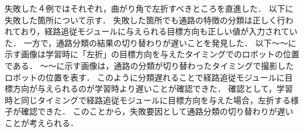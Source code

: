 失敗した４例ではそれぞれ，曲がり角で左折すべきところを直進した．
以下に失敗した箇所について示す．
失敗した箇所でも通路の特徴の分類は正しく行われており，経路追従モジュールに与えられる目標方向も正しい値が入力されていた．
一方で，通路分類の結果の切り替わりが遅いことを発見した．
以下〜〜に示す画像は学習時に「左折」の目標方向を与えたタイミングでのロボットの位置である．
〜〜に示す画像は，通路の分類が切り替わったタイミングで撮影したロボットの位置を表す．
このように分類遅れることで経路追従モジュールに目標方向が与えられるのが学習時より遅いことが確認できた．
確認として，学習時と同じタイミングで経路追従モジュールに目標方向を与えた場合，左折する様子が確認できた．
このことから，失敗要因として通路分類の切り替わりが遅いことが考えられる．
